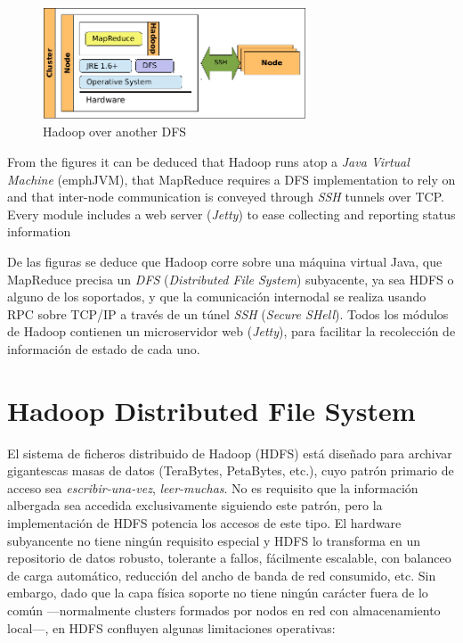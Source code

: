 \begin{figure}[tbp]
\begin{center}
\includegraphics[width=0.7\textwidth]{imagenes/016.pdf}
 \caption{Hadoop over another DFS}
\label{fig:hadoopmapreddfs}
\end{center}
\end{figure}

From the figures it can be deduced that Hadoop runs atop a \emph{Java Virtual Machine} (emph{JVM}), that MapReduce requires a DFS implementation to rely on and that inter-node communication is conveyed through \emph{SSH} tunnels over TCP. Every module includes a web server (\emph{Jetty}) to ease collecting and reporting status information



De las figuras se deduce que Hadoop corre sobre una m\'aquina virtual Java, que MapReduce precisa un \emph{DFS} (\emph{Distributed File System}) subyacente, ya sea HDFS o alguno de los soportados, y que la comunicaci\'on internodal se realiza usando RPC sobre TCP/IP a trav\'es de un t\'unel \emph{SSH} (\emph{Secure SHell}). Todos los m\'odulos de Hadoop contienen un microservidor web (\emph{Jetty}), para facilitar la recolecci\'on de informaci\'on de estado de cada uno.




\section{Hadoop Distributed File System}\label{sec:hdfs}
\noindent El sistema de ficheros distribuido de Hadoop (HDFS) est\'a dise\~nado para archivar gigantescas masas de datos (TeraBytes, PetaBytes, etc.), cuyo patr\'on primario de acceso sea \emph{escribir-una-vez}, \emph{leer-muchas}. No es requisito que la informaci\'on albergada sea accedida exclusivamente siguiendo este patr\'on, pero la implementaci\'on de HDFS potencia los accesos de este tipo. El hardware subyancente no tiene ning\'un requisito especial y HDFS lo transforma en un repositorio de datos robusto, tolerante a fallos, f\'acilmente escalable, con balanceo de carga autom\'atico, reducci\'on del ancho de banda de red consumido, etc. Sin embargo, dado que la capa f\'isica soporte no tiene ning\'un car\'acter fuera de lo com\'un ---normalmente clusters formados por nodos en red con almacenamiento local---, en HDFS confluyen algunas limitaciones operativas:


